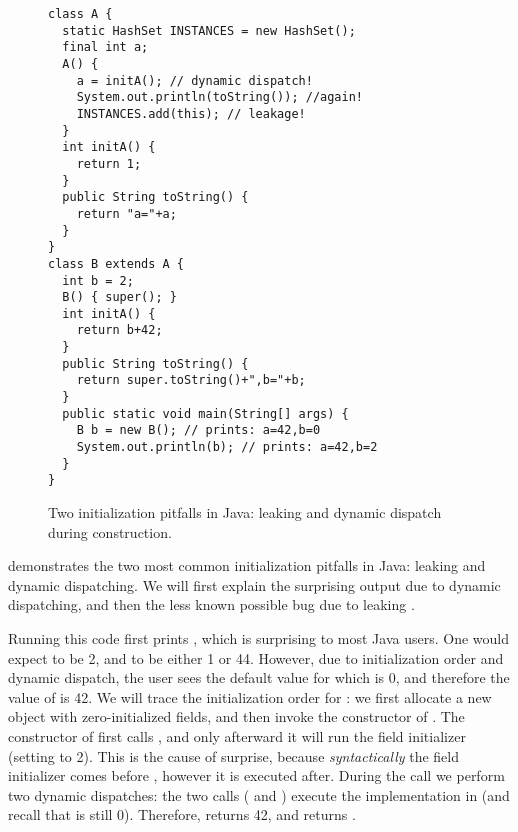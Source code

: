 \begin{figure}
\begin{lstlisting}
class A {
  static HashSet INSTANCES = new HashSet();
  final int a;
  A() {
    a = initA(); // dynamic dispatch!
    System.out.println(toString()); //again!
    INSTANCES.add(this); // leakage!
  }
  int initA() {
    return 1;
  }
  public String toString() {
    return "a="+a;
  }
}
class B extends A {
  int b = 2;
  B() { super(); }
  int initA() {
    return b+42;
  }
  public String toString() {
    return super.toString()+",b="+b;
  }
  public static void main(String[] args) {
    B b = new B(); // prints: a=42,b=0
    System.out.println(b); // prints: a=42,b=2
  }
}
\end{lstlisting}
\caption{Two initialization pitfalls in Java:
    leaking \this and dynamic dispatch during construction.}
\label{Figure:TwoPitfalls}
\end{figure}

 demonstrates the two most common initialization pitfalls in Java:
    leaking \this and dynamic dispatching.
We will first explain the surprising output due to dynamic dispatching,
    and then the less known possible bug due to leaking \this.

Running this code first prints , which is
    surprising to most Java users.
One would expect  to be 2, and  to be either 1 or 44.
However, due to initialization order and dynamic dispatch,
    the user sees the default value for  which is 0,
    and therefore the value of  is 42.
We will trace the initialization order for :
    we first allocate a new object with zero-initialized fields,
    and then invoke the constructor of .
The constructor of  first calls ,
    and only afterward it will run the field initializer (setting  to 2).
This is the cause of surprise, because \emph{syntactically} the field initializer comes before
    ,
    however it is executed after.
During the  call we perform two dynamic dispatches:
    the two calls ( and )
    execute the implementation in  (and recall that  is still 0).
Therefore,  returns 42, and  returns .

